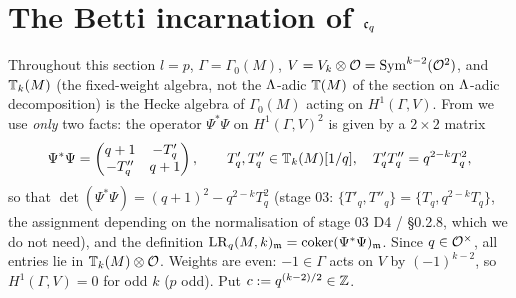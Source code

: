 \section{The Betti incarnation of \texorpdfstring{$\mathfrak{c}_q$}{c\_q}}

Throughout this section $l=p$, $\Gamma=\Gamma_0(M)$, $V=V_k\otimes\mathcal{O}=\mathrm{Sym}^{k-2}(\mathcal{O}^2)$, and $\mathbb{T}_k(M)$ (the fixed-weight algebra, not the $\Lambda$-adic $\mathbb{T}(M)$ of the section on $\Lambda$-adic decomposition) is the Hecke algebra of $\Gamma_0(M)$
acting on $H^1(\Gamma,V)$. From  we use \emph{only} two facts: the operator $\Psi^*\Psi$ on $H^1(\Gamma,V)^2$ is
given by a $2\times2$ matrix
\[\Psi^*\Psi=\begin{pmatrix}q+1&-T'_q\\-T''_q&q+1\end{pmatrix},\qquad T'_q,T''_q\in\mathbb{T}_k(M)[1/q],\quad T'_qT''_q=q^{2-k}T_q^2,\]
so that $\det(\Psi^*\Psi)=(q+1)^2-q^{2-k}T_q^2$ (stage 03: $\{T'_q,T''_q\}=\{T_q,q^{2-k}T_q\}$, the assignment depending on the
normalisation of stage 03 D4 /  \S0.2.8, which we do not need), and the definition
$\mathrm{LR}_q(M,k)_{\mathfrak{m}}=\operatorname{coker}(\Psi^*\Psi)_{\mathfrak{m}}$. Since $q\in\mathcal{O}^\times$, all entries lie in $\mathbb{T}_k(M)\otimes\mathcal{O}$. Weights are even: $-1\in\Gamma$
acts on $V$ by $(-1)^{k-2}$, so $H^1(\Gamma,V)=0$ for odd $k$ ($p$ odd). Put $c:=q^{(k-2)/2}\in\mathbb{Z}$.

